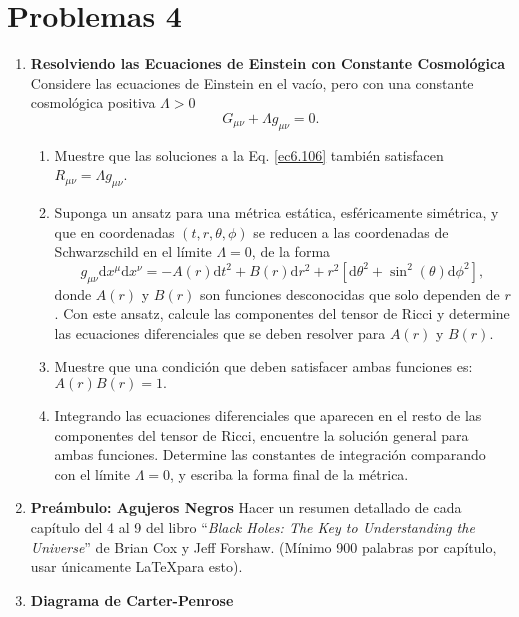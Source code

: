 \documentclass[../main]{subfiles}
\begin{document}
\section*{Problemas 4}

\begin{enumerate}
    \item \textbf{Resolviendo las Ecuaciones de Einstein con Constante Cosmológica}
    Considere las ecuaciones de Einstein en el vacío, pero con una constante cosmológica positiva $\Lambda >0$
    \begin{equation}
        G_{\mu\nu}+\Lambda g_{\mu\nu}=0.
        \label{ec6.106}
    \end{equation}
    \begin{enumerate}[label=(\alph*)]
        \item Muestre que las soluciones a la Eq. \eqref{ec6.106} también satisfacen $R_{\mu\nu}=\Lambda g_{\mu\nu}$.
        \item Suponga un ansatz para una métrica estática, esféricamente simétrica, y que en coordenadas $(t, r, \theta, \phi)$ se reducen a las coordenadas de Schwarzschild en el límite $\Lambda =0$, de la forma
        \begin{equation}
            g_{\mu\nu}\mathrm{d}x^{\mu}\mathrm{d}x^{\nu}=-A(r)\mathrm{d}t^2+B(r)\mathrm{d}r^2+r^2\left[\mathrm{d}\theta^2+\sin^2(\theta)\mathrm{d}\phi^2\right],
        \end{equation}
        donde $A(r)$ y $B(r)$ son funciones desconocidas que solo dependen de $r$. Con este ansatz, calcule las componentes del tensor de Ricci y determine las ecuaciones diferenciales que se deben resolver para $A(r)$ y $B(r)$.
        \item Muestre que una condición que deben satisfacer ambas funciones es: $A(r)B(r)=1.$
        \item Integrando las ecuaciones diferenciales que aparecen en el resto de las componentes del tensor de Ricci, encuentre la solución general para ambas funciones. Determine las constantes de integración comparando con el límite $\Lambda =0$, y escriba la forma final de la métrica.
    \end{enumerate}
    \item \textbf{Preámbulo: Agujeros Negros}
    Hacer un resumen detallado de cada capítulo del 4 al 9 del libro ``\textit{Black Holes: The Key to Understanding the Universe}'' de Brian Cox y Jeff Forshaw. (Mínimo 900 palabras por capítulo, usar únicamente \LaTeX para esto).
    \item \textbf{Diagrama de Carter-Penrose}

\end{enumerate}
\end{document}
